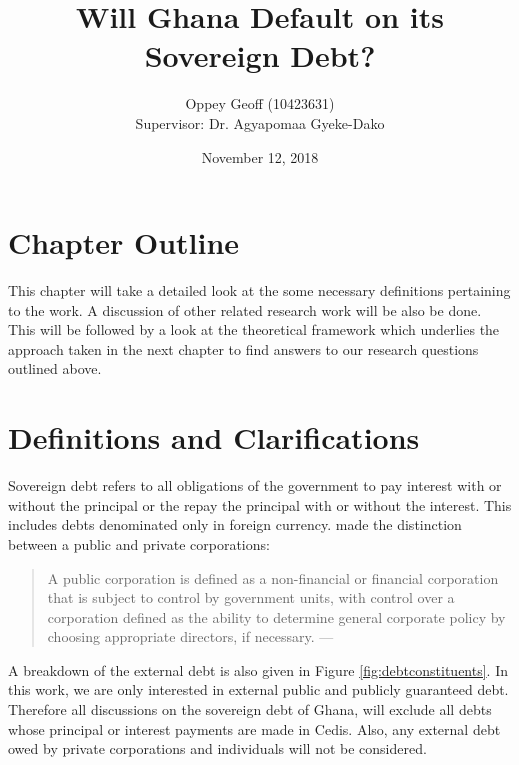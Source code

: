 \documentclass[12pt, a4paper]{article}
\title{Will Ghana Default on its Sovereign Debt?}
\author{Oppey Geoff (10423631) \\ Supervisor: Dr. Agyapomaa Gyeke-Dako}
\date{November 12, 2018}
\begin{document}
	\maketitle
	\clearpage
	\doublespacing
	
	\section{Chapter Outline}
	This chapter will take a detailed look at the some necessary definitions pertaining to the work. A discussion of other related research work will be also be done. This will be followed by a look at the theoretical framework which underlies the approach taken in the next chapter to find answers to our research questions outlined above.
	
	\section{Definitions and Clarifications}
	Sovereign debt refers to all obligations of the government to pay interest with or without the principal or the repay the principal with or without the interest. This includes debts denominated only in foreign currency.  made the distinction between a public and private corporations: %
	
	\begin{quotation}
		A public corporation is defined as a non-financial or financial corporation that is subject to control by government units, with control over a corporation defined as the ability to determine general corporate policy by choosing appropriate directors, if necessary.
		\hspace{1em plus 1fill}---\cite{EXTERNALDEBT}
	\end{quotation}

	A breakdown of the external debt is also given in Figure \ref{fig:debtconstituents}. In this work, we are only interested in external public and publicly guaranteed debt. Therefore all discussions on the sovereign debt of Ghana, will exclude all debts whose principal or interest payments are made in Cedis. Also, any external debt owed by private corporations and individuals will not be considered.
\end{document}

